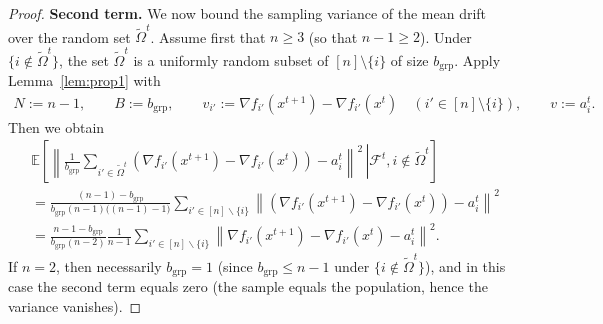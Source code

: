 \documentclass{article}
\newcommand{\sqn}[1]{\left\| #1 \right\|^2}
\newcommand{\eqdef}{:=}
\newcommand{\Expb}[2]{\mathbb{E}\!\left[\left. #1\,\right|#2 \right]}
\theoremstyle{plain}
\begin{document}
\begin{proof}
\textbf{Second term.}
We now bound the sampling variance of the mean drift over the random set $\tilde{\Omega}^t$.
Assume first that $n\geq 3$ (so that $n-1\geq 2$). Under $\{i\notin\tilde{\Omega}^t\}$, the set
$\tilde{\Omega}^t$ is a uniformly random subset of $[n]\setminus\{i\}$ of size $b_{\mathrm{grp}}$.
Apply Lemma~\ref{lem:prop1} with
\begin{align*}
N\eqdef n-1,\qquad B\eqdef b_{\mathrm{grp}},\qquad
v_{i'}\eqdef \nabla f_{i'}(x^{t+1})-\nabla f_{i'}(x^{t})\quad (i'\in[n]\setminus\{i\}),
\qquad v\eqdef a_i^t.
\end{align*}
Then we obtain
\begin{align*}
&\Expb{\sqn{\frac{1}{b_{\mathrm{grp}}}\sum_{i'\in \tilde{\Omega}^t}\left( \nabla f_{i'}(x^{t+1})-\nabla f_{i'}(x^{t})\right)-a_i^t}}{\mathcal{F}^t, i\notin\tilde{\Omega}^t}\\
&=\frac{(n-1)-b_{\mathrm{grp}}}{b_{\mathrm{grp}}(n-1)\big((n-1)-1\big)}\sum_{i'\in [n]\backslash\{i\}}
\sqn{\left(\nabla f_{i'}(x^{t+1})-\nabla f_{i'}(x^{t})\right)-a_i^t}\\
&=\frac{n-1-b_{\mathrm{grp}}}{b_{\mathrm{grp}}(n-2)}\frac{1}{n-1}\sum_{i'\in [n]\backslash\{i\}}
\sqn{\nabla f_{i'}(x^{t+1})-\nabla f_{i'}(x^{t})-a_i^t}.
\end{align*}
If $n=2$, then necessarily $b_{\mathrm{grp}}=1$ (since $b_{\mathrm{grp}}\leq n-1$ under $\{i\notin\tilde{\Omega}^t\}$), and in this case the second term equals zero (the sample equals the population, hence the variance vanishes).


\end{proof}
\end{document}
